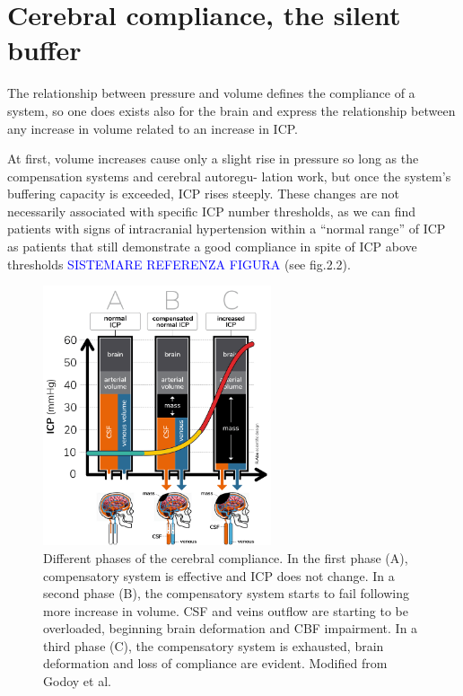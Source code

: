 \section[Cerebral compliance, the silent buffer]{Cerebral compliance, the silent buffer}
The relationship between pressure and volume defines the compliance of a system, so one does exists also for the brain and express the relationship between any increase in volume related to an increase in ICP.

At first, volume increases cause only a slight rise in pressure so long as the compensation systems and cerebral autoregu- lation work, but once the system’s buffering capacity is exceeded, ICP rises steeply.
These changes are not necessarily associated with specific ICP number thresholds, as we can find patients with signs of intracranial hypertension within a “normal range” of ICP as patients that still demonstrate a good compliance in spite of ICP above thresholds \textcolor{blue}{SISTEMARE REFERENZA FIGURA} (see fig.2.2). \\

\begin{figure}[h]
    \centering
    \includegraphics[width=0.6\textwidth]{pictures/fig2.png}
    \caption{Different phases of the cerebral compliance. In the first phase (A), compensatory system is effective and ICP does not change. In a second phase (B), the compensatory system starts to fail following more increase in volume. CSF and veins outflow are starting to be overloaded, beginning brain deformation and CBF impairment. In a third phase (C), the compensatory system is exhausted, brain deformation and loss of compliance are evident. Modified from Godoy et al.\cite{godoyIntracranialCompartmentalSyndrome2023a}}
\end{figure}


